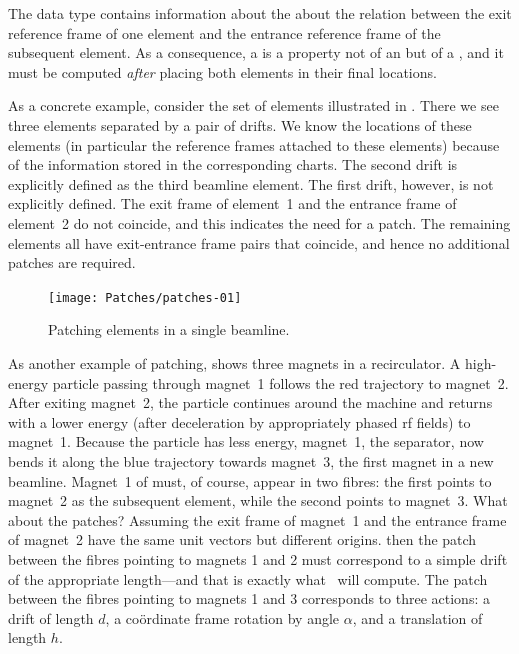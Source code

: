 %
The data type  contains information about the
about the relation between the exit reference frame of one
element and the entrance reference frame of the subsequent
element. As a consequence, a  is a property not
of an  but of a , and it must
be computed \emph{after} placing both elements in their final
locations.

As a concrete example, consider the set of elements illustrated
in . There we see three elements separated by
a pair of drifts. We know the locations of these elements
(in particular the reference frames attached to these elements)
because of the information stored in the corresponding charts.
The second drift is explicitly defined as the third beamline
element. The first drift, however, is not explicitly defined.
The exit frame of element~1 and the entrance frame of element~2
do not coincide, and this indicates the need for a patch. The
remaining elements all have exit-entrance frame pairs that
coincide, and hence no additional patches are required.

\begin{figure}[ht]%
  \centering
  \texttt{[image: Patches/patches-01]}
  \caption{Patching elements in a single beamline.}
  \label{fig:patch.elems}
\end{figure}

%
As another example of patching,  shows three
magnets in a recirculator. A high-energy particle passing through
magnet~1 follows the red trajectory to magnet~2. After exiting
magnet~2, the particle continues around the machine and returns
with a lower energy (after deceleration by appropriately phased
rf fields) to magnet~1. Because the particle has less energy,
magnet~1, the separator, now bends it along the blue trajectory
towards magnet~3, the first magnet in a new beamline.
Magnet~1 of  must, of course, appear in two
fibres: the first points to magnet~2 as the subsequent element,
while the second points to magnet~3. What about the patches?
Assuming the exit frame of magnet~1 and the entrance frame of
magnet~2 have the same unit vectors but different origins. then
the patch between the fibres pointing to magnets 1 and 2 must
correspond to a simple drift of the appropriate length---and that
is exactly what \PTC\ will compute. The patch between the fibres
pointing to magnets 1 and 3 corresponds to three actions: a drift
of length $d$, a co\"ordinate frame rotation by angle $\alpha$,
and a translation of length $h$.

